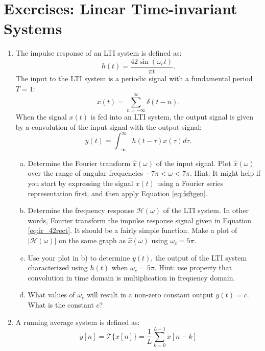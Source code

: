 \newpage
\section{Exercises: Linear Time-invariant Systems}
\begin{enumerate}
\item The impulse response of an LTI system is defined as:
\begin{equation}
    h(t) = \frac{42\sin(\omega_c t)}{\pi t}.
    \label{eq:ir_42rect}
\end{equation}
The input to the LTI system is a periodic signal with a fundamental period $T=1$:
\begin{equation}
    x(t) = \sum_{n=-\infty}^{\infty}\delta(t-n).
\end{equation}
When the signal $x(t)$ is fed into an LTI system, the output signal is given by a convolution of the input signal with the output signal:
\begin{equation}
    y(t) = \int_{-\infty}^{\infty} h(t-\tau)x(\tau) d\tau.
\end{equation}
\begin{enumerate}[a)]
\item Determine the Fourier transform $\hat{x}(\omega)$ of the input signal. Plot $\hat{x}(\omega)$ over the range of angular frequencies $-7\pi < \omega < 7\pi$. Hint: It might help if you start by expressing the signal $x(t)$ using a Fourier series representation first, and then apply Equation \ref{eq:fsftgen}.
\item Determine the frequency response $\mathcal{H}(\omega)$ of the LTI system. In other words, Fourier transform the impulse response signal given in Equation \ref{eq:ir_42rect}. It should be a fairly simple function. Make a plot of $|\mathcal{H}(\omega)|$ on the same graph as $\hat{x}(\omega)$ using $\omega_c = 5\pi$.
\item Use your plot in b) to determine $y(t)$, the output of the LTI system characterized using $h(t)$ when $\omega_c=5\pi$. Hint: use property that convolution in time domain is multiplication in frequency domain.
\item What values of $\omega_c$ will result in a non-zero constant output $y(t)=c$. What is the constant $c$?
\end{enumerate}

\item A running average system is defined as:
  \begin{equation}
    y[n] = \mathcal{T}\{x[n]\} = \frac{1}{L}\sum_{k=0}^{L-1} x[n-k]
  \end{equation}


\end{enumerate}
